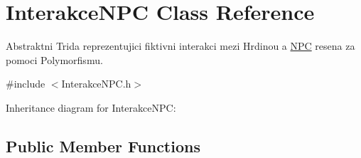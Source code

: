 \hypertarget{class_interakce_n_p_c}{\section{Interakce\-N\-P\-C Class Reference}
\label{class_interakce_n_p_c}
}


Abstraktni Trida reprezentujici fiktivni interakci mezi Hrdinou a \hyperlink{class_n_p_c}{N\-P\-C} resena za pomoci Polymorfismu.  




{\ttfamily \#include $<$Interakce\-N\-P\-C.\-h$>$}



Inheritance diagram for Interakce\-N\-P\-C\-:
\subsection*{Public Member Functions}
